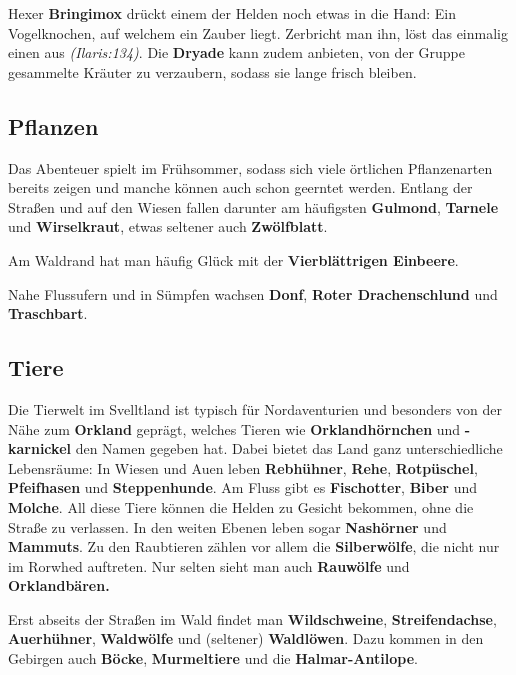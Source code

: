\begin{center}
\end{center}

Hexer \textbf{Bringimox} drückt einem der Helden noch etwas in die Hand:
Ein Vogelknochen, auf welchem ein Zauber liegt. Zerbricht man ihn, löst das einmalig einen  aus \emph{(Ilaris:134)}.
Die \textbf{Dryade} kann zudem anbieten, von der Gruppe gesammelte Kräuter zu verzaubern, sodass sie lange frisch bleiben.

\neueseite



\subsection[Pflanzen und Tiere]{Pflanzen}
Das Abenteuer spielt im Frühsommer, sodass sich viele örtlichen Pflanzenarten bereits zeigen und manche können auch schon geerntet werden. Entlang der Straßen und auf den Wiesen fallen darunter am häufigsten \textbf{Gulmond}, \textbf{Tarnele} und \textbf{Wirselkraut}, etwas seltener auch \textbf{Zwölfblatt}.

Am Waldrand hat man häufig Glück mit der \textbf{Vierblättrigen Einbeere}.

Nahe Flussufern und in Sümpfen wachsen \textbf{Donf}, \textbf{Roter Drachenschlund} und \textbf{Traschbart}.

\neuespalte

\subsection*{Tiere}
\label{svellt}
	Die Tierwelt im Svelltland ist typisch für Nordaventurien und besonders von der Nähe zum \textbf{Orkland} geprägt,
welches Tieren wie \textbf{Orklandhörnchen} und \textbf{-karnickel} den Namen gegeben hat.
Dabei bietet das Land ganz unterschiedliche Lebensräume:
In Wiesen und Auen leben \textbf{Rebhühner}, \textbf{Rehe}, \textbf{Rotpüschel}, \textbf{Pfeifhasen} und \textbf{Steppenhunde}.
Am Fluss gibt es \textbf{Fischotter}, \textbf{Biber} und \textbf{Molche}. All diese Tiere können die Helden zu Gesicht bekommen, ohne die Straße zu verlassen. In den weiten Ebenen leben sogar \textbf{Nashörner} und \textbf{Mammuts}.
Zu den Raubtieren zählen vor allem die \textbf{Silberwölfe}, die nicht nur im Rorwhed auftreten. Nur selten sieht man auch \textbf{Rauwölfe} und \textbf{Orklandbären.}

Erst abseits der Straßen im Wald findet man \textbf{Wildschweine}, \textbf{Streifendachse}, \textbf{Auerhühner}, \textbf{Waldwölfe} und (seltener) \textbf{Waldlöwen}. Dazu kommen in den Gebirgen auch \textbf{Böcke}, \textbf{Murmeltiere} und die \textbf{Halmar-Antilope}.


